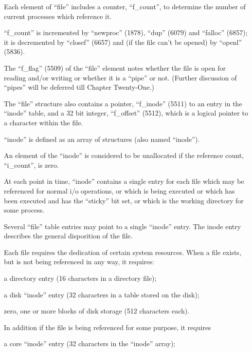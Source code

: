 Each element of ``file'' includes a
counter, ``f\_count'', to determine the
number of current processes which
reference it.

``f\_count'' is incremented by ``newproc''
(1878), ``dup'' (6079) and ``falloc''
(6857); it is decremented by ``closef''
(6657) and (if the file can't be
opened) by ``openl'' (5836).

The ``f\_flag'' (5509) of the ``file'' element notes whether the file is open for
reading and/or writing or whether it is
a ``pipe'' or not. (Further discussion of
``pipes'' will be deferred till Chapter
Twenty-One.)

The ``file'' structure also contains a
pointer, ``f\_inode'' (5511) to an entry
in the ``inode'' table, and a 32 bit
integer, ``f\_offset'' (5512), which is a
logical pointer to a character within
the file.



``inode'' is defined as an array of
structures (also named ``inode'').


An element of the ``inode''
is considered to be unallocated if the reference
count, ``i\_count'', is zero.

At each point in time, ``inode'' contains
a single entry for each file which may
be referenced for normal i/o operations, or which is being executed or
which has been executed and has the
``sticky'' bit set, or which is the working directory for some process.


Several ``file'' table entries may point
to a single ``inode'' entry. The inode
entry describes the general disporition
of the file.


Each file requires the dedication of
certain system resources. When a file
exists, but is not being referenced in
any way, it requires:

\bd
\item[(a)] a directory entry (16 characters
 in a directory file);

\item[(b)] a disk ``inode'' entry (32 characters in a table stored on the
disk);

\item[(c)] zero, one or more blocks of disk
 storage (512 characters each).
\ed


\noindent In addition if the file is being referenced for some purpose, it requires

\bd
\item[(d)] a core ``inode'' entry (32 characters in the ``inode'' array);
\ed


